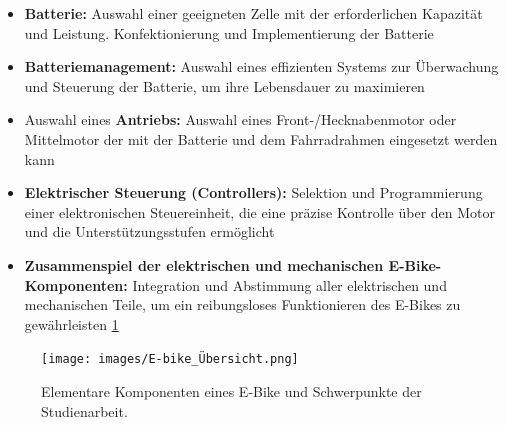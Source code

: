 \begin{itemize}
    \item \textbf{Batterie:} Auswahl einer geeigneten Zelle mit der erforderlichen Kapazität und Leistung. Konfektionierung und Implementierung der Batterie
    \item \textbf{Batteriemanagement:} Auswahl eines effizienten Systems zur Überwachung und Steuerung der Batterie, um ihre Lebensdauer zu maximieren
    \item Auswahl eines \textbf{Antriebs:} Auswahl eines Front-/Hecknabenmotor oder Mittelmotor der mit der Batterie und dem Fahrradrahmen eingesetzt werden kann
    \item \textbf{Elektrischer Steuerung (Controllers):} Selektion und Programmierung einer elektronischen Steuereinheit, die eine präzise Kontrolle über den Motor und die Unterstützungsstufen ermöglicht
    \item \textbf{Zusammenspiel der elektrischen und mechanischen E-Bike-Komponenten:} Integration und Abstimmung aller elektrischen und mechanischen Teile, um ein reibungsloses Funktionieren des E-Bikes zu gewährleisten \ref{fig:Uebersicht}
\end{itemize}




\begin{figure}[h]
    \centering
    \texttt{[image: images/E-bike\_Übersicht.png]}
    \caption{Elementare Komponenten eines E-Bike und Schwerpunkte der Studienarbeit.}
    \label{fig:Uebersicht}
\end{figure}


